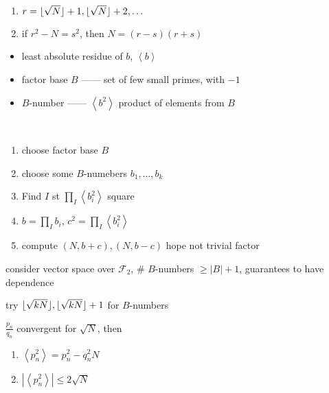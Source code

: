 \begin{example}\,
    \begin{enumerate}
        \item $r = \lfloor\sqrt{N}\rfloor + 1, \lfloor\sqrt{N}\rfloor + 2, \dots$
        \item if $r^2 - N = s^2$, then $N = (r-s)(r+s)$
    \end{enumerate}
\end{example}

\begin{itemize}
    \item least absolute residue of $b$, $\left< b \right>$
    \item factor base $B$ ------ set of few small primes, with $-1$
    \item $B$-number ------ $\left< b^2 \right>$ product of elements from $B$
\end{itemize}

\begin{example}\,
    \begin{enumerate}
        \item choose factor base $B$
        \item choose some $B$-numebers $b_1, \dots, b_k$
        \item Find $I$ st $\prod_I \left< b^2_i \right>$ square
        \item $b = \prod_I b_i$, $c^2 = \prod_I \left< b^2_i \right>$
        \item compute $(N, b+c), (N, b-c)$ hope not trivial factor
    \end{enumerate}
\end{example}

\begin{fact}
    consider vector space over $\mathcal{F}_2$, $\#$ $B$-numbers $\geq |B| + 1$, guarantees to have dependence
\end{fact}

\begin{fact}
    try $\lfloor\sqrt{kN}\rfloor, \lfloor\sqrt{kN}\rfloor + 1$ for $B$-numbers
\end{fact}

\begin{lemma}
    $\frac{p_n}{q_n}$ convergent for $\sqrt{N}$, then
    \begin{enumerate}
        \item $\left< p_n^2 \right> = p_n^2 - q_n^2 N$
        \item $| \left< p_n^2 \right> | \leq 2 \sqrt{N}$
    \end{enumerate}
\end{lemma}


